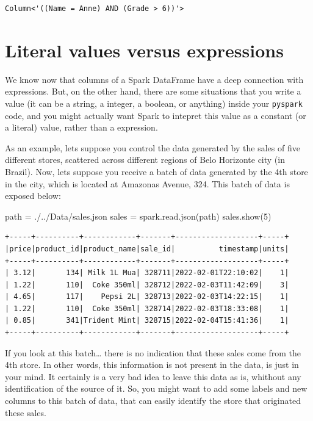 \documentclass[
  11pt,
  letterpaper,
  DIV=11,
  numbers=noendperiod]{scrreprt}
\newenvironment{Shaded}{\begin{snugshade}}{\end{snugshade}}
\newcommand{\DecValTok}[1]{\textcolor[rgb]{0.68,0.00,0.00}{#1}}
\newcommand{\NormalTok}[1]{\textcolor[rgb]{0.00,0.23,0.31}{#1}}
\newcommand{\OperatorTok}[1]{\textcolor[rgb]{0.37,0.37,0.37}{#1}}
\newcommand{\StringTok}[1]{\textcolor[rgb]{0.13,0.47,0.30}{#1}}
\begin{document}
\begin{verbatim}
Column<'((Name = Anne) AND (Grade > 6))'>
\end{verbatim}

\hypertarget{literal-values-versus-expressions}{%
\section{Literal values versus
expressions}\label{literal-values-versus-expressions}}

We know now that columns of a Spark DataFrame have a deep connection
with expressions. But, on the other hand, there are some situations that
you write a value (it can be a string, a integer, a boolean, or
anything) inside your \texttt{pyspark} code, and you might actually want
Spark to intepret this value as a constant (or a literal) value, rather
than a expression.

As an example, lets suppose you control the data generated by the sales
of five different stores, scattered across different regions of Belo
Horizonte city (in Brazil). Now, lets suppose you receive a batch of
data generated by the 4th store in the city, which is located at
Amazonas Avenue, 324. This batch of data is exposed below:

\begin{Shaded}
\begin{Highlighting}[]
\NormalTok{path }\OperatorTok{=} \StringTok{\textquotesingle{}./../Data/sales.json\textquotesingle{}}
\NormalTok{sales }\OperatorTok{=}\NormalTok{ spark.read.json(path)}
\NormalTok{sales.show(}\DecValTok{5}\NormalTok{)}
\end{Highlighting}
\end{Shaded}

\begin{verbatim}
+-----+----------+------------+-------+-------------------+-----+
|price|product_id|product_name|sale_id|          timestamp|units|
+-----+----------+------------+-------+-------------------+-----+
| 3.12|       134| Milk 1L Mua| 328711|2022-02-01T22:10:02|    1|
| 1.22|       110|  Coke 350ml| 328712|2022-02-03T11:42:09|    3|
| 4.65|       117|    Pepsi 2L| 328713|2022-02-03T14:22:15|    1|
| 1.22|       110|  Coke 350ml| 328714|2022-02-03T18:33:08|    1|
| 0.85|       341|Trident Mint| 328715|2022-02-04T15:41:36|    1|
+-----+----------+------------+-------+-------------------+-----+
\end{verbatim}

If you look at this batch\ldots{} there is no indication that these
sales come from the 4th store. In other words, this information is not
present in the data, is just in your mind. It certainly is a very bad
idea to leave this data as is, whithout any identification of the source
of it. So, you might want to add some labels and new columns to this
batch of data, that can easily identify the store that originated these
sales.
\end{document}
